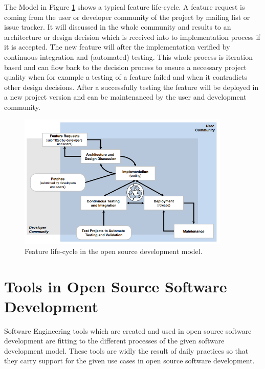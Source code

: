 \documentclass[DIV=calc,paper=a4,fontsize=11pt,twocolumn]{scrartcl}
\begin{document}
The Model in Figure \ref{fig:feature-life-cycle} shows a typical feature life-cycle. A feature request is coming from the user or developer community of the project by mailing list or issue tracker. It will discussed in the whole community and results to an architecture or design decision which is received into to implementation process if it is accepted. The new feature will after the implementation verified by continuous integration and (automated) testing. This whole process is iteration based and can flow back to the decision process to ensure a necessary project quality when for example a testing of a feature failed and when it contradicts other design decisions. After a successfully testing the feature will be deployed in a new project version and can be maintenanced by the user and development community. \citep{Haddad11}

\begin{figure}[ht]
    \includegraphics[width=0.9\textwidth ]{img/feature-life-cycle.png}{}
    \centering
    \caption{Feature life-cycle in the open source development model. \citet{Haddad11}}\label{fig:feature-life-cycle}
\end{figure}

\section{Tools in Open Source Software Development}

Software Engineering tools which are created and used in open source software development are fitting to the different processes of the given software development model. These tools are widly the result of daily practices so that they carry support for the given use cases in open source software development. \citep{Robbins02adoptingoss} 
\end{document}
